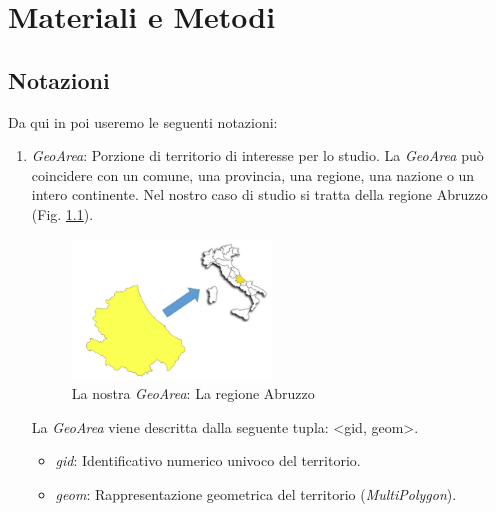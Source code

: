 \chapter{Materiali e Metodi} %

\label{ch:materialandmethods} %


\section{Notazioni}
\label{notazioni}
Da qui in poi useremo le seguenti notazioni:
\begin{enumerate}


\item \textit{GeoArea}: Porzione di territorio di interesse per lo studio. La \textit{GeoArea} può coincidere con un comune, una provincia, una regione, una nazione o un intero continente. Nel nostro caso di studio si tratta della regione Abruzzo (Fig. \ref{fig:abruzzo}).
\begin{figure}[h]
	\centering		\includegraphics[width=0.5\textwidth]{img/abruzzo}
	\caption{La nostra \textit{GeoArea}: La regione Abruzzo}
    	\label{fig:abruzzo}
\end{figure}

La \textit{GeoArea} viene descritta dalla seguente tupla: <gid, geom>.
\begin{itemize}
\item \textit{gid}: Identificativo numerico univoco del territorio.
\item \textit{geom}: Rappresentazione geometrica del territorio (\textit{MultiPolygon}).
\end{itemize}


\end{enumerate}
